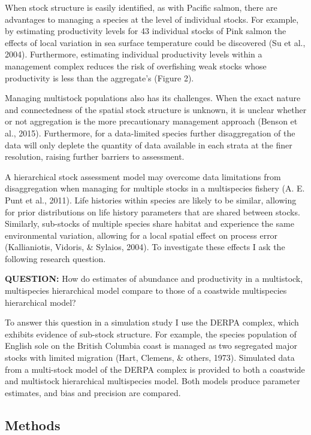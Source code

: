 \documentclass[12pt,]{scrartcl}
\begin{document}
When stock structure is easily identified, as with Pacific salmon, there
are advantages to managing a species at the level of individual stocks.
For example, by estimating productivity levels for 43 individual stocks
of Pink salmon the effects of local variation in sea surface temperature
could be discovered (Su et al., 2004). Furthermore, estimating
individual productivity levels within a management complex reduces the
risk of overfishing weak stocks whose productivity is less than the
aggregate's (Figure 2).

Managing multistock populations also has its challenges. When the exact
nature and connectedness of the spatial stock structure is unknown, it
is unclear whether or not aggregation is the more precautionary
management approach (Benson et al., 2015). Furthermore, for a
data-limited species further disaggregation of the data will only
deplete the quantity of data available in each strata at the finer
resolution, raising further barriers to assessment.

A hierarchical stock assessment model may overcome data limitations from
disaggregation when managing for multiple stocks in a multispecies
fishery (A. E. Punt et al., 2011). Life histories within species are
likely to be similar, allowing for prior distributions on life history
parameters that are shared between stocks. Similarly, sub-stocks of
multiple species share habitat and experience the same environmental
variation, allowing for a local spatial effect on process error
(Kallianiotis, Vidoris, \& Sylaios, 2004). To investigate these effects
I ask the following research question.

\textbf{QUESTION:} How do estimates of abundance and productivity in a
multistock, multispecies hierarchical model compare to those of a
coastwide multispecies hierarchical model?

To answer this question in a simulation study I use the DERPA complex,
which exhibits evidence of sub-stock structure. For example, the species
population of English sole on the British Columbia coast is managed as
two segregated major stocks with limited migration (Hart, Clemens, \&
others, 1973). Simulated data from a multi-stock model of the DERPA
complex is provided to both a coastwide and multistock hierarchical
multispecies model. Both models produce parameter estimates, and bias
and precision are compared.

\subsection{Methods}\label{methods-1}
\end{document}
